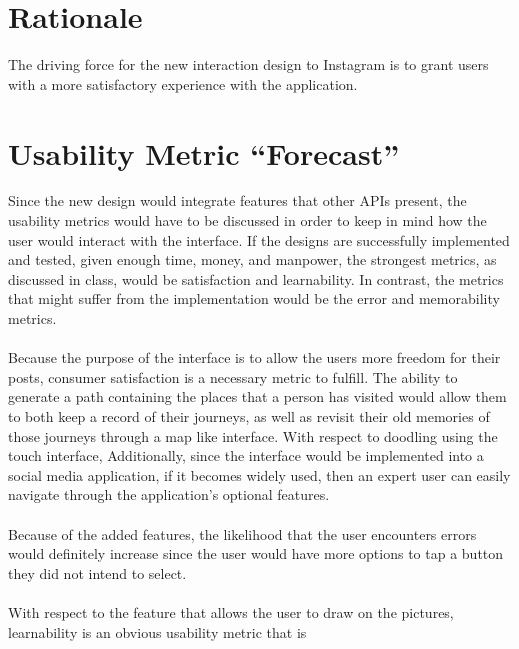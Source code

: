 \documentclass[11pt]{article}
\begin{document}
\pagebreak

\section{Rationale}
   \indent
   \indent The driving force for the new interaction design to Instagram is to grant users with a more satisfactory experience with the application.  


\section{Usability Metric ``Forecast''}
   \indent 
   \indent Since the new design would integrate features that other APIs present, the usability metrics would have to be discussed in order to keep in mind how the user would interact with the interface. If the designs are successfully implemented and tested, given enough time, money, and manpower, the strongest metrics, as discussed in class, would be satisfaction and learnability. In contrast, the metrics that might suffer from the implementation would be the error and memorability metrics.\\ \\
   \indent Because the purpose of the interface is to allow the users more freedom for their posts, consumer satisfaction is a necessary metric to fulfill. The ability to generate a path containing the places that a person has visited would allow them to both keep a record of their journeys, as well as revisit their old memories of those journeys through a map like interface. With respect to doodling using the touch interface, Additionally, since the interface would be implemented into a social media application, if it becomes widely used, then an expert user can easily navigate through the application's optional features.\\ \\
   \indent Because of the added features, the likelihood that the user encounters errors would definitely increase since the user would have more options to tap a button they did not intend to select. \\ \\
   \indent With respect to the feature that allows the user to draw on the pictures, learnability is an obvious usability metric that is \\

\clearpage


\end{document}
